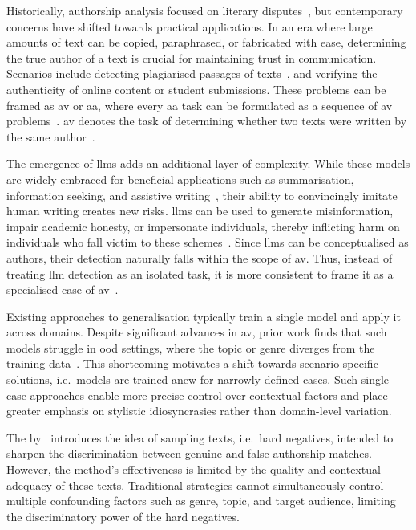 Historically, authorship analysis focused on literary disputes~\citep{neal_surveying_2018,stamatatos_survey_2009}, but contemporary concerns have shifted towards practical applications.
In an era where large amounts of text can be copied, paraphrased, or fabricated with ease, determining the true author of a text is crucial for maintaining trust in communication. 
Scenarios include detecting plagiarised passages of texts~\citep{stein_intrinsic_2011}, and verifying the authenticity of online content or student submissions. 
These problems can be framed as \acf{av} or \acf{aa}, where every \ac{aa} task can be formulated as a sequence of \ac{av} problems~\citep{tyo_state_2022,barlas_cross_domain_2020}.
\ac{av} denotes the task of determining whether two texts were written by the same author~\citep{koppel_authorship_2004}.

The emergence of \acp{llm} adds an additional layer of complexity. 
While these models are widely embraced for beneficial applications such as summarisation, information seeking, and assistive writing~\citep{wang_stumbling_2024}, their ability to convincingly imitate human writing creates new risks. 
\acp{llm} can be used to generate misinformation, impair academic honesty, or impersonate individuals, thereby inflicting harm on individuals who fall victim to these schemes~\citep{mitchell_detectgpt_2023,li_learning_2025,wang_stumbling_2024,bhattacharjee_fighting_2024}. 
Since \acp{llm} can be conceptualised as authors, their detection naturally falls within the scope of \ac{av}. 
Thus, instead of treating \ac{llm} detection as an isolated task, it is more consistent to frame it as a specialised case of \ac{av}~\citep{llm_detection_av_2025}.

Existing approaches to generalisation typically train a single model and apply it across domains.
Despite significant advances in \ac{av}, prior work finds that such models struggle in \ac{ood} settings, where the topic or genre diverges from the training data~\citep{Sundararajan_style_18,bischoff_importance_2020,li_learning_2025}. 
This shortcoming motivates a shift towards scenario-specific solutions, i.e.\ models are trained anew for narrowly defined cases. 
Such single-case approaches enable more precise control over contextual factors and place greater emphasis on stylistic idiosyncrasies rather than domain-level variation.

The \impAppr{} by \citet{koppel_determining_2014}\ introduces the idea of sampling \imp{} texts, i.e.\ hard negatives, intended to sharpen the discrimination between genuine and false authorship matches. 
However, the method's effectiveness is limited by the quality and contextual adequacy of these \imp{} texts. 
Traditional strategies cannot simultaneously control multiple confounding factors such as genre, topic, and target audience, limiting the discriminatory power of the hard negatives.

